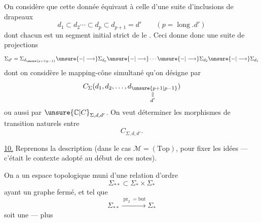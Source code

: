 
On considère que cette donnée équivaut à celle d'une
suite d'inclusions de drapeaux
\[
 d_1\subset d_2\cdots\subset d_p\subset d_{p+1}=d'
 \qquad(p=\operatorname{long}.d')
\]
dont chacun est un segment initial strict de
le .
Ceci donne donc  une
suite de projections
\[
 \Sigma_{d'}=\Sigma_{d_{\unsure{p+1|p-1}}}\unsure{-|\longrightarrow}\Sigma_{d_p}
 \unsure{-|\longrightarrow}\cdots\unsure{-|\longrightarrow}\Sigma_{d_2}
 \unsure{-|\longrightarrow}\Sigma_{d_1}
\]
dont on considère le mapping-cône simultané
qu'on désigne par
\[
 C_\Sigma(d_1,d_2,\ldots,
 \underset{\substack{\Vert\\d'}}{d_{\unsure{p+1|p-1}}})
\]
ou aussi par \(\unsure{\mathbb C|C}_{\Sigma,d,d'}\).
On veut déterminer les
morphismes  de transition naturels entre
\[
 C_{\Sigma,d,d'}.
\]



\uline{10.} Reprenons la description 
(dans le cas \(\mathcal M=(\mathrm{Top})\), pour fixer les idées
--- c'était le contexte adopté au début de ces notes).

On a un espace topologique
muni d'une relation d'ordre
\[
 \Sigma_{**}\subset\Sigma_*\times\Sigma_*
\]
ayant un graphe fermé, et tel que
\[
 \Sigma_{**}\xrightarrow{\operatorname{pr}_2=\mathrm{but}}\Sigma_*
\]
soit une  --- plus

